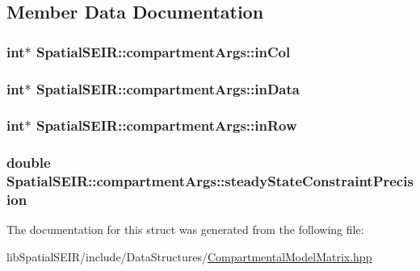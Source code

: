 \subsection{Member Data Documentation}
\hypertarget{structSpatialSEIR_1_1compartmentArgs_a099157d615a905760cbfffecfc1ae601}{
\subsubsection[{in\-Col}]{\setlength{\rightskip}{0pt plus 5cm}int$\ast$ Spatial\-S\-E\-I\-R\-::compartment\-Args\-::in\-Col}}\label{structSpatialSEIR_1_1compartmentArgs_a099157d615a905760cbfffecfc1ae601}
\hypertarget{structSpatialSEIR_1_1compartmentArgs_a02fa1783ef4a4a0d8392e262801d9016}{
\subsubsection[{in\-Data}]{\setlength{\rightskip}{0pt plus 5cm}int$\ast$ Spatial\-S\-E\-I\-R\-::compartment\-Args\-::in\-Data}}\label{structSpatialSEIR_1_1compartmentArgs_a02fa1783ef4a4a0d8392e262801d9016}
\hypertarget{structSpatialSEIR_1_1compartmentArgs_a5a19df565b3856bb4ba528557c13c0e1}{
\subsubsection[{in\-Row}]{\setlength{\rightskip}{0pt plus 5cm}int$\ast$ Spatial\-S\-E\-I\-R\-::compartment\-Args\-::in\-Row}}\label{structSpatialSEIR_1_1compartmentArgs_a5a19df565b3856bb4ba528557c13c0e1}
\hypertarget{structSpatialSEIR_1_1compartmentArgs_a6ec9286a8db3ca4bfb153932d4c0fe30}{
\subsubsection[{steady\-State\-Constraint\-Precision}]{\setlength{\rightskip}{0pt plus 5cm}double Spatial\-S\-E\-I\-R\-::compartment\-Args\-::steady\-State\-Constraint\-Precision}}\label{structSpatialSEIR_1_1compartmentArgs_a6ec9286a8db3ca4bfb153932d4c0fe30}


The documentation for this struct was generated from the following file\-:\begin{DoxyCompactItemize}
\item 
lib\-Spatial\-S\-E\-I\-R/include/\-Data\-Structures/\hyperlink{CompartmentalModelMatrix_8hpp}{Compartmental\-Model\-Matrix.\-hpp}\end{DoxyCompactItemize}
